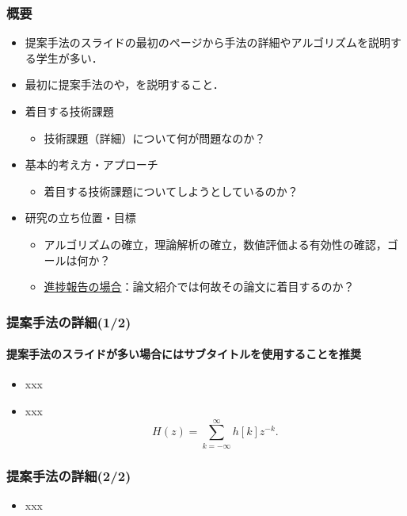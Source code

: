 \documentclass[dvipdfmx,cjk,t,10pt]{beamer}
\begin{document}
\begin{frame}
\frametitle{概要}

	\begin{screen}
		\begin{itemize}
		\item 提案手法のスライドの最初のページから手法の詳細やアルゴリズムを説明する学生が多い．
		\item 最初に提案手法のや，を説明すること．
		\end{itemize}			
	\end{screen}

	\begin{itemize}
	\item 着目する技術課題
		\begin{itemize}
		\item 技術課題（詳細）について何が問題なのか？
		\end{itemize}
	\item 基本的考え方・アプローチ
		\begin{itemize}
		\item 着目する技術課題についてしようとしているのか？
		\end{itemize}	
	\item 研究の立ち位置・目標
		\begin{itemize}
		\item アルゴリズムの確立，理論解析の確立，数値評価よる有効性の確認，ゴールは何か？
		\item \underline{進捗報告の場合}：論文紹介では何故その論文に着目するのか？
		\end{itemize}		
	\end{itemize}	
\end{frame}

\begin{frame}
\frametitle{提案手法の詳細(1/2)}
\framesubtitle{提案手法のスライドが多い場合にはサブタイトルを使用することを推奨}

	\begin{itemize}
	\item xxx
	\item xxx
	\[
		H(z) = \sum_{k=-\infty}^{\infty} h[k] z^{-k}.
	\]	
	\end{itemize}	
\end{frame}

\begin{frame}
\frametitle{提案手法の詳細(2/2)}

	\begin{itemize}
	\item xxx
	\end{itemize}	
\end{frame}
\end{document}
